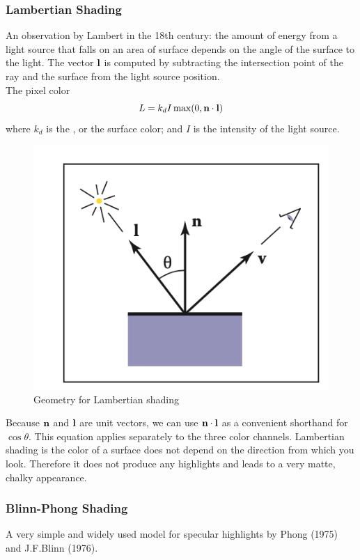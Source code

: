 \documentclass[11pt]{article}
\numberwithin{equation}{section}
\begin{document}
\subsubsection{Lambertian Shading}
An observation by Lambert in the 18th century: the amount of energy from a light source that falls on an area of surface depends on the angle of the surface to the light.
The vector $\textbf{l}$ is computed by subtracting the intersection point of the ray and the surface from the light source position.\\
The pixel color
$$L = k_dI\max(0, \textbf{n} \cdot \textbf{l})$$
where $k_d$ is the , or the surface color; and $I$ is the intensity of the light source.
\begin{figure}[H]
	\centering
	\includegraphics[scale=0.7]{p1}
	\caption{Geometry for Lambertian shading}
\end{figure}
\remark
Because $\textbf{n}$ and $\textbf{l}$ are unit vectors, we can use $\textbf{n} \cdot \textbf{l}$ as a convenient shorthand for $\cos \theta$. This equation applies separately to the three color channels.
\remark
Lambertian shading is  the color of a surface does not depend on the direction from which you look. Therefore it does not produce any highlights and leads to a very matte, chalky appearance.

\subsubsection{Blinn-Phong Shading}
A very simple and widely used model for specular highlights by Phong (1975) and J.F.Blinn (1976).
\end{document}
